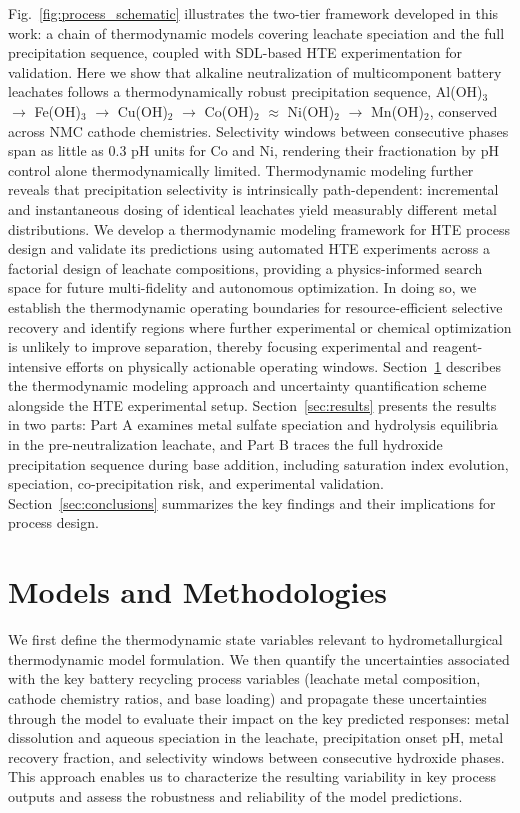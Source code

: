 \documentclass[final,2p,times]{elsarticle}
\begin{document}
Fig.~\ref{fig:process_schematic} illustrates the two-tier framework developed in this work: a chain of thermodynamic models covering leachate speciation and the full precipitation sequence, coupled with SDL-based HTE experimentation for validation. Here we show that alkaline neutralization of multicomponent battery leachates follows a thermodynamically robust precipitation sequence, Al(OH)$_3$ $\to$ Fe(OH)$_3$ $\to$ Cu(OH)$_2$ $\to$ Co(OH)$_2$ $\approx$ Ni(OH)$_2$ $\to$ Mn(OH)$_2$, conserved across NMC cathode chemistries. Selectivity windows between consecutive phases span as little as 0.3 pH units for Co and Ni, rendering their fractionation by pH control alone thermodynamically limited. Thermodynamic modeling further reveals that precipitation selectivity is intrinsically path-dependent: incremental and instantaneous dosing of identical leachates yield measurably different metal distributions. We develop a thermodynamic modeling framework for HTE process design and validate its predictions using automated HTE experiments across a factorial design of leachate compositions, providing a physics-informed search space for future multi-fidelity and autonomous optimization. In doing so, we establish the thermodynamic operating boundaries for resource-efficient selective recovery and identify regions where further experimental or chemical optimization is unlikely to improve separation, thereby focusing experimental and reagent-intensive efforts on physically actionable operating windows. Section~\ref{sec:methods} describes the thermodynamic modeling approach and uncertainty quantification scheme alongside the HTE experimental setup. Section~\ref{sec:results} presents the results in two parts: Part A examines metal sulfate speciation and hydrolysis equilibria in the pre-neutralization leachate, and Part B traces the full hydroxide precipitation sequence during base addition, including saturation index evolution, speciation, co-precipitation risk, and experimental validation. Section~\ref{sec:conclusions} summarizes the key findings and their implications for process design.


\section{Models and Methodologies}\label{sec:methods}

We first define the thermodynamic state variables relevant to hydrometallurgical thermodynamic model formulation. We then quantify the uncertainties associated with the key battery recycling process variables (leachate metal composition, cathode chemistry ratios, and base loading) and propagate these uncertainties through the model to evaluate their impact on the key predicted responses: metal dissolution and aqueous speciation in the leachate, precipitation onset pH, metal recovery fraction, and selectivity windows between consecutive hydroxide phases. This approach enables us to characterize the resulting variability in key process outputs and assess the robustness and reliability of the model predictions.
\end{document}
